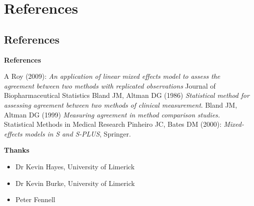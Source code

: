 \documentclass[compress]{beamer}        %
\makeatletter
\newcommand{\tcb}{\textcolor{beamer@blendedblue}}
\makeatother
\begin{document}
\section[References]{References}
\subsection{References}
\begin{frame}{\bf \tcb{References}}
\begin{thebibliography}{99}
 A Roy (2009): \emph{An application of linear mixed effects model to assess the agreement between two methods with replicated observations} Journal of Biopharmaceutical Statistics
 Bland JM, Altman DG (1986) \emph{Statistical method for assessing agreement between two methods of clinical measurement}.
 Bland JM, Altman DG (1999)  \emph{Measuring agreement in method comparison studies.} Statistical Methods in Medical Research
 Pinheiro JC, Bates DM (2000): \emph{Mixed-effects models in S and S-PLUS},
Springer.
\end{thebibliography}
\end{frame}


\begin{frame}{\bf \tcb{Thanks}}
\begin{itemize}
\item Dr Kevin Hayes, University of Limerick
\item Dr Kevin Burke, University of Limerick
\item Peter Fennell
\end{itemize}
\end{frame}
\end{document}
